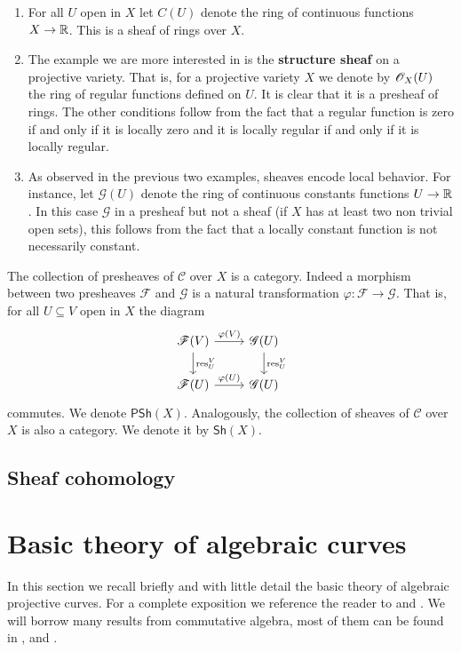 \begin{example}\label{ex:examples-of-sheaves}
	\begin{enumerate}[label = (\alph*)]
		\item For all $U$ open in $X$ let $C(U)$ denote the ring of continuous functions $X \to {\mathbb R}$. This is a sheaf of rings over $X$. 
		\item The example we are more interested in is the \textbf{structure sheaf} on a projective variety. That is, for a projective variety $X$ we denote by ${\mathscr O}_{X}(U)$ the ring of regular functions defined on $U$. It is clear that it is a presheaf of rings. The other conditions follow from the fact that a regular function is zero if and only if it is locally zero and it is locally regular if and only if it is locally regular.
		\item As observed in the previous two examples, sheaves encode local behavior. For instance, let $\mathscr{G}(U)$ denote the ring of continuous constants functions $U \to {\mathbb R}$. In this case $\mathscr{G}$ in a presheaf but not a sheaf (if $X$ has at least two non trivial open sets), this follows from the fact that a locally constant function is not necessarily constant.
	\end{enumerate}
\end{example}
The collection of presheaves of $\mathcal{C}$ over $X$ is a category. Indeed a morphism between two presheaves $\mathscr{F}$ and $\mathscr{G}$ is a natural transformation $\varphi\colon \mathscr{F} \to \mathscr{G}$. That is, for all $U \subseteq V$ open in $X$ the diagram
\[
	\begin{tikzcd}
		\mathscr{F}(V) \arrow[r, "\varphi(V)"] \arrow[d, "\res^{V}_{U}"] & \mathscr{G}(U) \arrow[d, "\res^{V}_{U}"] \\
		\mathscr{F}(U) \arrow[r, "\varphi(U)"] & \mathscr{G}(U)
	\end{tikzcd}
\]
commutes. We denote $\mathsf{PSh}(X)$. Analogously, the collection of sheaves of $\mathcal{C}$ over $X$ is also a category. We denote it by $\mathsf{Sh}(X)$. 

\subsection{Sheaf cohomology}

\section{Basic theory of algebraic curves}
In this section we recall briefly and with little detail the basic theory of algebraic projective curves. For a complete exposition we reference the reader to \cite{curves} and \cite{hartshorne}. We will borrow many results from commutative algebra, most of them can be found in \cite{Matsumura}, \cite{comm-alg} and \cite{atiyah}.


